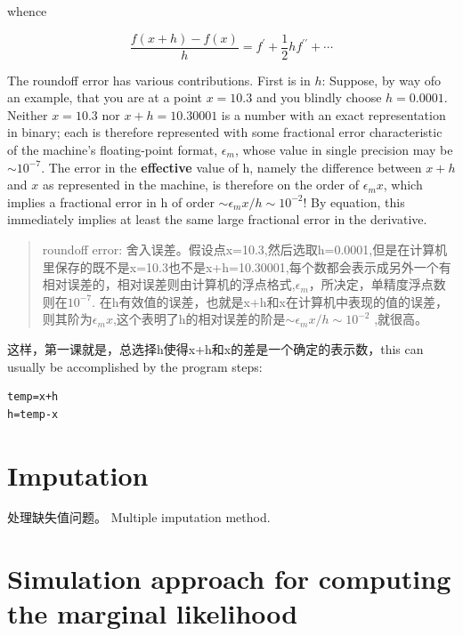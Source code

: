\documentclass[
]{book}
\theoremstyle{definition}
\theoremstyle{definition}
\theoremstyle{definition}
\theoremstyle{remark}
\begin{document}
whence

\[
\frac{f(x+h)-f(x)}{h}=f^{\prime}+\frac{1}{2} h f^{\prime \prime}+\cdots
\]

The roundoff error has various contributions. First is in \(h\):
Suppose, by way ofo an example, that you are at a point \(x=10.3\) and you blindly choose \(h=0.0001\). Neither \(x=10.3\) nor \(x+h=10.30001\) is a number with an exact representation in binary; each is therefore represented with some fractional error characteristic of the machine's floating-point format, \(\epsilon_m\), whose value in single precision may be \(\sim 10^{-7}\). The error in the \textbf{effective} value of h, namely the difference between \(x+h\) and \(x\) as represented in the machine, is therefore on the order of \(\epsilon_m x\), which implies a fractional error in h of order \(\sim \epsilon_mx/h\sim10^{-2}\)! By equation, this immediately implies at least the same large fractional error in the derivative.

\begin{quote}
roundoff error: 舍入误差。假设点x=10.3,然后选取h=0.0001,但是在计算机里保存的既不是x=10.3也不是x+h=10.30001,每个数都会表示成另外一个有相对误差的，相对误差则由计算机的浮点格式,\(\epsilon_m\)，所决定，单精度浮点数则在\(10^{-7}\). 在h有效值的误差，也就是x+h和x在计算机中表现的值的误差，则其阶为\(\epsilon_m x\),这个表明了h的相对误差的阶是\(\sim \epsilon_m x/h\sim 10^{-2}\) ,就很高。
\end{quote}

这样，第一课就是，总选择h使得x+h和x的差是一个确定的表示数，this can usually be accomplished by the program steps:

\begin{verbatim}
temp=x+h
h=temp-x
\end{verbatim}

\hypertarget{imputation}{%
\chapter{Imputation}\label{imputation}}

处理缺失值问题。
Multiple imputation method.

\hypertarget{simulation-approach-for-computing-the-marginal-likelihood}{%
\chapter{Simulation approach for computing the marginal likelihood}\label{simulation-approach-for-computing-the-marginal-likelihood}}
\end{document}
